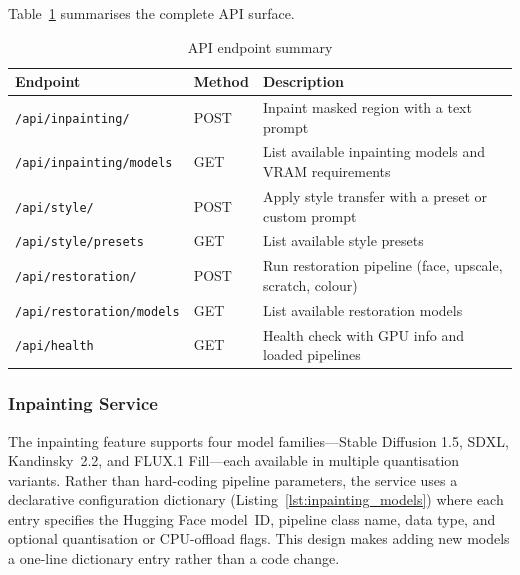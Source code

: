 \documentclass[12pt,a4paper]{report}
\begin{document}
Table~\ref{tab:api_endpoints} summarises the complete API surface.

\begin{table}[H]
\centering
\caption{API endpoint summary}
\label{tab:api_endpoints}
\begin{tabularx}{\textwidth}{l l X}
\toprule
\textbf{Endpoint} & \textbf{Method} & \textbf{Description} \\
\midrule
\texttt{/api/inpainting/} & POST & Inpaint masked region with a text prompt \\
\texttt{/api/inpainting/models} & GET & List available inpainting models and VRAM requirements \\
\texttt{/api/style/} & POST & Apply style transfer with a preset or custom prompt \\
\texttt{/api/style/presets} & GET & List available style presets \\
\texttt{/api/restoration/} & POST & Run restoration pipeline (face, upscale, scratch, colour) \\
\texttt{/api/restoration/models} & GET & List available restoration models \\
\texttt{/api/health} & GET & Health check with GPU info and loaded pipelines \\
\bottomrule
\end{tabularx}
\end{table}

\subsubsection{Inpainting Service}
\label{sec:inpainting_service}

The inpainting feature supports four model families---Stable Diffusion 1.5, SDXL, Kandinsky~2.2, and FLUX.1 Fill---each available in multiple quantisation variants. Rather than hard-coding pipeline parameters, the service uses a declarative configuration dictionary (Listing~\ref{lst:inpainting_models}) where each entry specifies the Hugging Face model~ID, pipeline class name, data type, and optional quantisation or CPU-offload flags. This design makes adding new models a one-line dictionary entry rather than a code change.
\end{document}
